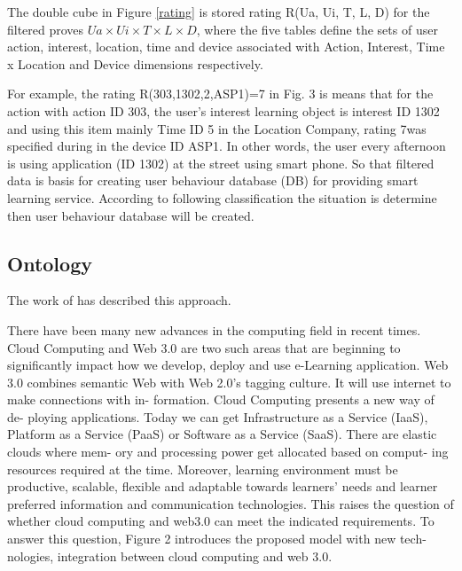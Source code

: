 \documentclass[journal]{vgtc}                %
\begin{document}
  The double cube in Figure \ref{rating} is stored rating R(Ua, Ui, T, L, D) for the filtered proves $Ua \times Ui \times T \times L \times D$, where the five tables define the sets of user action, interest, location, time and device associated with Action, Interest, Time x Location and Device dimensions respectively.

  For example, the rating R(303,1302,2,ASP1)=7 in Fig. 3 is means that for the action with action ID 303, the user's interest learning object is interest ID 1302 and using this item mainly Time ID 5 in the Location Company, rating 7was specified during in the device ID ASP1. In other words, the user every afternoon is using application (ID 1302) at the street using smart phone. So that filtered data is basis for creating user behaviour database (DB) for providing smart learning service. According to following classification the situation is determine then user behaviour database will be created.

  
  \subsection{Ontology}
  The work of \cite{nasr2012proposed} has described this approach.

  There have been many new advances in the computing field in recent times. Cloud Computing and Web 3.0 are two such areas that are beginning to significantly impact how we develop, deploy and use e-Learning application. Web 3.0 combines semantic Web with Web 2.0’s tagging culture. It will use internet to make connections with in- formation. Cloud Computing presents a new way of de- ploying applications. Today we can get Infrastructure as a Service (IaaS), Platform as a Service (PaaS) or Software as a Service (SaaS). There are elastic clouds where mem- ory and processing power get allocated based on comput- ing resources required at the time. Moreover, learning environment must be productive, scalable, flexible and adaptable towards learners’ needs and learner preferred information and communication technologies. This raises the question of whether cloud computing and web3.0 can meet the indicated requirements. To answer this question, Figure 2 introduces the proposed model with new tech- nologies, integration between cloud computing and web 3.0.
\end{document}
